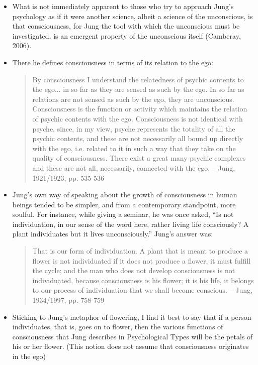 \begin{itemize}

\item What is not immediately apparent to those who try to approach Jung's
psychology as if it were another science, albeit a science of the unconscious,
is that consciousness, for Jung the tool with which the unconscious must be
investigated, is an emergent property of the unconscious itself (Camberay,
2006).

\item There he defines consciousness in terms of its relation to the ego:
\begin{quote}
By consciousness I understand the relatedness of psychic contents to the ego...
in so far as they are sensed as such by the ego. In so far as relations are not
sensed as such by the ego, they are unconscious. Consciousness is the function
or activity which maintains the relation of psychic contents with the ego.
Consciousness is not identical with psyche, since, in my view, psyche
represents the totality of all the psychic contents, and these are not
necessarily all bound up directly with the ego, i.e. related to it in such a
way that they take on the quality of consciousness. There exist a great many
psychic complexes and these are not all, necessarily, connected with the ego.
-- Jung, 1921/1923, pp. 535-536
\end{quote}

\item Jung's own way of speaking about the growth of consciousness in human
beings tended to be simpler, and from a contemporary standpoint, more soulful.
For instance, while giving a seminar, he was once asked, ``Is not individuation,
in our sense of the word here, rather living life consciously? A plant individuates
but it lives unconsciously.'' Jung's answer was:
\begin{quote}
That is our form of individuation. A plant that is meant to produce a flower is
not individuated if it does not produce a flower, it must fulfill the cycle;
and the man who does not develop consciousness is not individuated, because
consciousness is his flower; it is his life, it belongs to our process of
individuation that we shall become conscious. -- Jung, 1934/1997, pp. 758-759
\end{quote}

\item Sticking to Jung's metaphor of flowering, I find it best to say that if a
person individuates, that is, goes on to flower, then the various functions of
consciousness that Jung describes in Psychological Types will be the petals of
his or her flower. (This notion does not assume that consciousness originates
in the ego)


\end{itemize}
